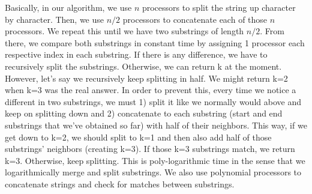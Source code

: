 \documentclass{article}
\begin{document}
Basically, in our algorithm, we use $n$ processors to split the string up character by character.  Then, we use $n/2$ processors to concatenate each of those $n$ processors.  We repeat this until we have two substrings of length $n/2$.  From there, we compare both substrings in constant time by assigning 1 processor each respective index in each substring.  If there is any difference, we have to recursively split the substrings.  Otherwise, we can return k at the moment.  However, let's say we recursively keep splitting in half.  We might return k=2 when k=3 was the real answer.  In order to prevent this, every time we notice a different in two substrings, we must 1) split it like we normally would above and keep on splitting down and 2) concatenate to each substring (start and end substrings that we've obtained so far) with half of their neighbors.  This way, if we get down to k=2, we should split to k=1 and then also add half of those substrings' neighbors (creating k=3).  If those k=3 substrings match, we return k=3.  Otherwise, keep splitting.  This is poly-logarithmic time in the sense that we logarithmically merge and split substrings.  We also use polynomial processors to concatenate strings and check for matches between substrings.
\end{document}
